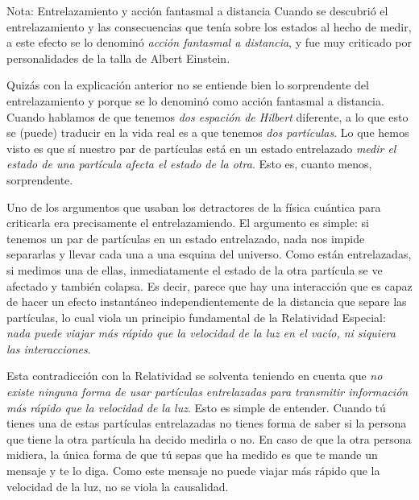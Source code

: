 \documentclass[a4paper,11pt]{book} %
\numberwithin{equation}{chapter}
\begin{document}
	\begin{mybox_blue}{Nota: Entrelazamiento y acción fantasmal a distancia}
	Cuando se descubrió el entrelazamiento y las consecuencias que tenía sobre los estados al hecho de medir, a este efecto se lo denominó
	\textit{acción fantasmal a distancia}, y fue muy criticado por personalidades de la talla de Albert Einstein. 
	
	\vspace{0.3cm}
	Quizás con la explicación anterior no se entiende bien lo sorprendente del entrelazamiento y porque se lo denominó como acción fantasmal a distancia.
	Cuando hablamos de que tenemos \textit{dos espación de Hilbert} diferente, a lo que esto se (puede) traducir en la vida real es a que tenemos \textit{dos partículas}.
	Lo que hemos visto es que sí nuestro par de partículas está en un estado entrelazado \textit{medir el estado de una partícula afecta el estado de la otra}. 
	Esto es, cuanto menos, sorprendente. 

	\vspace{0.3cm}	
	Uno de los argumentos que usaban los detractores de la física cuántica para criticarla era precisamente el entrelazamiendo. El argumento es simple: si tenemos un par de 
	partículas en un estado entrelazado, nada nos impide separarlas y llevar cada una a una esquina del universo. Como están entrelazadas, si medimos una de ellas, 
	inmediatamente el estado de la otra partícula se ve afectado y también colapsa. Es decir, parece que hay una interacción que es capaz de hacer un efecto instantáneo 
	independientemente de la distancia que separe las partículas, lo cual viola un principio fundamental de la Relatividad Especial: \textit{nada puede viajar más rápido que 
	la velocidad de la luz en el vacío, ni siquiera las interacciones}. 

	\vspace{0.3cm}	
	Esta contradicción con la Relatividad se solventa teniendo en cuenta que \textit{no existe ninguna forma de usar partículas entrelazadas para transmitir información más 
	rápido que la velocidad de la luz}. Esto es simple de entender. Cuando tú tienes una de estas partículas entrelazadas no tienes forma de saber si la persona que tiene la 
	otra partícula ha decido medirla o no. En caso de que la otra persona midiera, la única forma de que tú sepas que ha medido es que te mande un mensaje y te lo diga. 
	Como este mensaje no puede viajar más rápido que la velocidad de la luz, no se viola la causalidad. 
	\end{mybox_blue}
\end{document}
